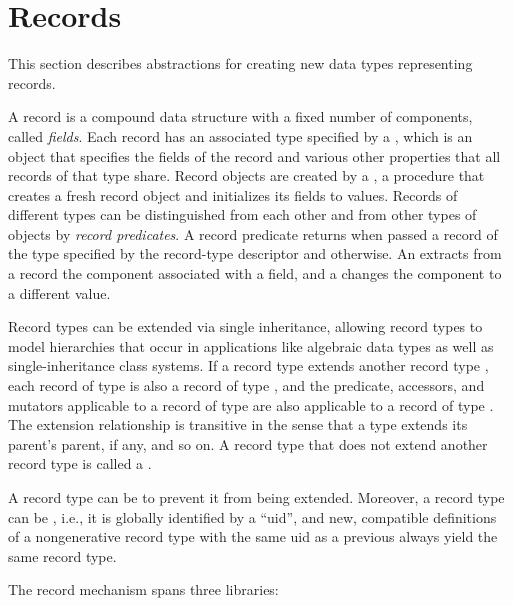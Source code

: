 \chapter{Records}
\label{recordschapter}
This section describes abstractions for creating new data types
representing records.

A record is a compound data structure with a fixed number of
components, called \textit{fields}.  Each record has
an associated type specified by a ,
which is an object that specifies the fields of the record and various
other properties that all records of that type share.  Record objects
are created by a , a procedure that
creates a fresh record object and initializes its fields to values.
Records of different types can be distinguished from each other and
from other types of objects by \textit{record predicates}. A record predicate
returns \schtrue{} when passed a record of the type specified by the
record-type descriptor and \schfalse{} otherwise.
An  extracts from a record
the component associated with a field, and a 
changes the component to a different value.

Record types can be extended via single inheritance, allowing record
types to model hierarchies that occur in applications like algebraic
data types as well as single-inheritance class systems.  If a record
type  extends another record type , each record of type
 is also a record of type , and the predicate,
accessors, and mutators applicable to a record of type  are
also applicable to a record of type .  The extension
relationship is transitive in the sense that a type extends its
parent's parent, if any, and so on.  A record type that does not
extend another record type is called a .

A
record type can be  to prevent it from being
extended.  Moreover, a record type can be ,
i.e., it is globally identified by a ``uid'', and new, compatible
definitions of a nongenerative record type with the same uid as a
previous always yield the same record type.

The record mechanism spans three libraries:

